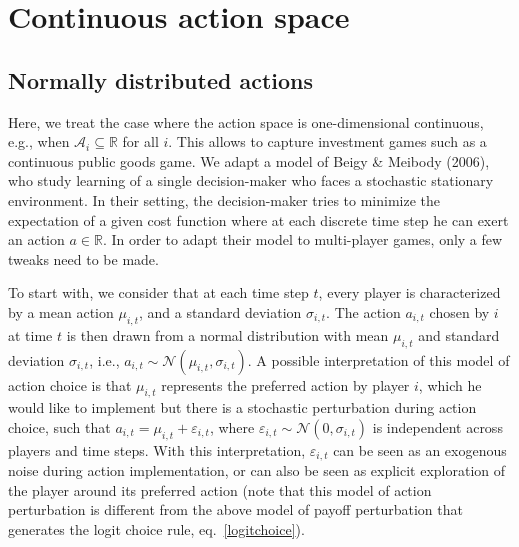 \documentclass[11pt,reqno]{amsart}
\newcommand{\ac}{a}
\newcommand{\Ac}{\mathcal{A}}
\newcommand{\Rn}{\mathds{R}}
\newcommand{\tm}{t}%
\newcommand{\ma}{\mu}
\newcommand{\sd}{\sigma}
\newcommand{\Nd}{\mathcal{N}}
\begin{document}
\clearpage


\section{Continuous action space}

\subsection{Normally distributed actions}

Here, we treat the case where the action space is one-dimensional continuous, e.g., when $\Ac_i \subseteq \Rn$ for all $i$. This allows to capture investment games such as a continuous public goods game. We  adapt a model of Beigy \& Meibody (2006), who study learning of a single decision-maker who faces a stochastic stationary environment. In their setting, the decision-maker tries to minimize the expectation of a given cost function where at each discrete time step he can exert an action $\ac \in \Rn$. In order to adapt their model to multi-player games, only a few tweaks need to be made.

To start with, we consider that at each time step $\tm$, every player is characterized by a mean action $\ma_{i,\tm}$, and a standard deviation $\sd_{i,\tm}$. The action $\ac_{i,\tm}$ chosen by $i$ at time $\tm$ is then drawn from a normal distribution with mean $\ma_{i,\tm}$ and standard deviation $\sd_{i,\tm}$, i.e., $\ac_{i,\tm} \sim \Nd(\ma_{i,\tm},\sd_{i,\tm})$. A possible interpretation of this model of action choice is that $\ma_{i,\tm}$ represents the preferred action by player $i$, which he would like to implement but there is a stochastic perturbation during action choice, such that $\ac_{i,\tm} = \ma_{i,\tm} + \varepsilon_{i,\tm}$, where $\varepsilon_{i,\tm} \sim \Nd(0,\sd_{i,\tm})$ is independent across players and time steps. With this interpretation, $\varepsilon_{i,\tm}$ can be seen as an exogenous noise during action implementation, or can also be seen as explicit exploration of the player around its preferred action (note that this model of action perturbation is different from the above model of payoff perturbation that generates the logit choice rule, eq.~\ref{logitchoice}).
\end{document}
